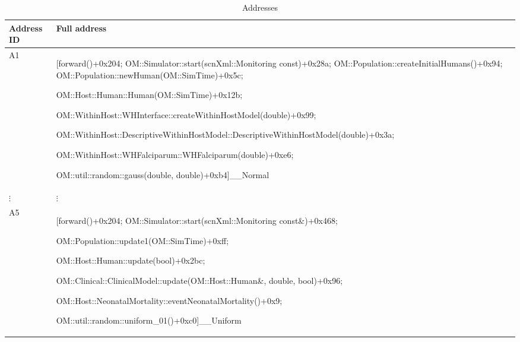 \documentclass{article}
\begin{document}
  \begin{table}[h!]
  \footnotesize
  \setlength{\tabcolsep}{1mm}
  \caption{Addresses }
  \label{table:addresses}
  \def\arraystretch{1.25}
  \begin{tabularx}{\textwidth}{@{}lX@{}} 
    \toprule
    Address ID & Full address \\
    \midrule
  A1 & [forward()+0x204; OM::Simulator::start(scnXml::Monitoring const)+0x28a;
  OM::Population::createInitialHumans()+0x94;
  OM::Population::newHuman(OM::SimTime)+0x5c;

  OM::Host::Human::Human(OM::SimTime)+0x12b;

  OM::WithinHost::WHInterface::createWithinHostModel(double)+0x99;

  OM::WithinHost::DescriptiveWithinHostModel::DescriptiveWithinHostModel(double)+0x3a;

  OM::WithinHost::WHFalciparum::WHFalciparum(double)+0xe6;

  OM::util::random::gauss(double, double)+0xb4]\_\_Normal\\

   $\vdots$ & $\vdots$ \\
  A5 & [forward()+0x204; OM::Simulator::start(scnXml::Monitoring const\&)+0x468;

   OM::Population::update1(OM::SimTime)+0xff;

    OM::Host::Human::update(bool)+0x2bc;

    OM::Clinical::ClinicalModel::update(OM::Host::Human\&, double, bool)+0x96;

    OM::Host::NeonatalMortality::eventNeonatalMortality()+0x9;

    OM::util::random::uniform\_01()+0xc0]\_\_Uniform\\






\end{tabularx}
\end{table}
\end{document}
